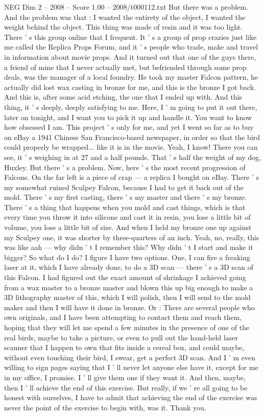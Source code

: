 \begin{textsample}{NEG Dim 2 – 2008 – Score 1.00 – 2008/t000112.txt}
But there was a problem.
And the problem was that : I wanted the entirety of the object, I wanted the weight behind the object.
This thing was made of resin and it was too light.
There ' s this group online that I frequent.
It ' s a group of prop crazies just like me called the Replica Props Forum, and it ' s people who trade, make and travel in information about movie props.
And it turned out that one of the guys there, a friend of mine that I never actually met, but befriended through some prop deals, was the manager of a local foundry.
He took my master Falcon pattern, he actually did lost wax casting in bronze for me, and this is the bronze I got back.
And this is, after some acid etching, the one that I ended up with.
And this thing, it ' s deeply, deeply satisfying to me.
Here, I ' m going to put it out there, later on tonight, and I want you to pick it up and handle it.
You want to know how obsessed I am.
This project ' s only for me, and yet I went so far as to buy on eBay a 1941 Chinese San Francisco-based newspaper, in order so that the bird could properly be wrapped... like it is in the movie.
Yeah, I know!
There you can see, it ' s weighing in at 27 and a half pounds.
That ' s half the weight of my dog, Huxley.
But there ' s a problem.
Now, here ' s the most recent progression of Falcons.
On the far left is a piece of crap — a replica I bought on eBay.
There ' s my somewhat ruined Sculpey Falcon, because I had to get it back out of the mold.
There ' s my first casting, there ' s my master and there ' s my bronze.
There ' s a thing that happens when you mold and cast things, which is that every time you throw it into silicone and cast it in resin, you lose a little bit of volume, you lose a little bit of size.
And when I held my bronze one up against my Sculpey one, it was shorter by three-quarters of an inch.
Yeah, no, really, this was like aah — why didn ' t I remember this?
Why didn ' t I start and make it bigger?
So what do I do?
I figure I have two options.
One, I can fire a freaking laser at it, which I have already done, to do a 3D scan — there ' s a 3D scan of this Falcon.
I had figured out the exact amount of shrinkage I achieved going from a wax master to a bronze master and blown this up big enough to make a 3D lithography master of this, which I will polish, then I will send to the mold maker and then I will have it done in bronze.
Or : There are several people who own originals, and I have been attempting to contact them and reach them, hoping that they will let me spend a few minutes in the presence of one of the real birds, maybe to take a picture, or even to pull out the hand-held laser scanner that I happen to own that fits inside a cereal box, and could maybe, without even touching their bird, I swear, get a perfect 3D scan.
And I ' m even willing to sign pages saying that I ' ll never let anyone else have it, except for me in my office, I promise.
I ' ll give them one if they want it.
And then, maybe, then I ' ll achieve the end of this exercise.
But really, if we ' re all going to be honest with ourselves, I have to admit that achieving the end of the exercise was never the point of the exercise to begin with, was it.
Thank you.

\end{textsample}
